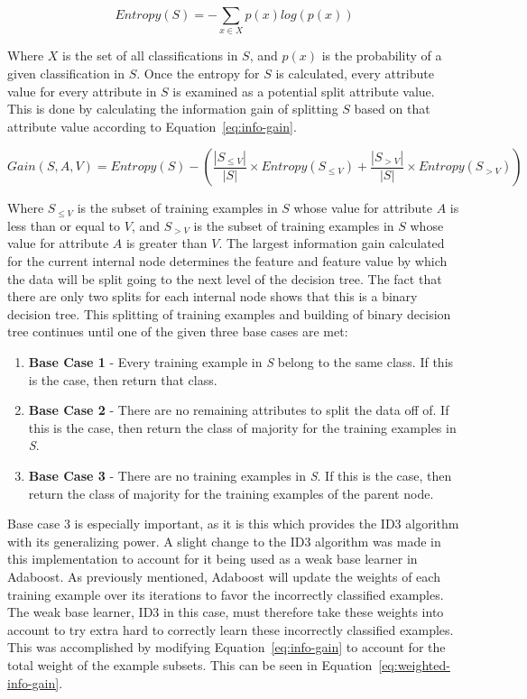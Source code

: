\documentclass[a4paper]{article}
\begin{document}
\begin{equation}
    \label{eq:entropy}
    Entropy(S) = -\sum_{x \in X} p(x)log(p(x))
\end{equation}

Where $X$ is the set of all classifications in $S$, and $p(x)$ is the probability of a given classification in $S$. Once the entropy for $S$ is calculated, every attribute value for every attribute in $S$ is examined as a potential split attribute value. This is done by calculating the information gain of splitting $S$ based on that attribute value according to Equation~\ref{eq:info-gain}.

\begin{equation}
    \label{eq:info-gain}
    Gain(S, A, V) = Entropy(S) - \left(\frac{|S_{\le V}|}{|S|}\times Entropy(S_{\le V}) + \frac{|S_{> V}|}{|S|}\times Entropy(S_{> V}) \right)
\end{equation}

Where $S_{\le V}$ is the subset of training examples in $S$ whose value for attribute $A$ is less than or equal to $V$, and $S_{> V}$ is the subset of training examples in $S$ whose value for attribute $A$ is greater than $V$. The largest information gain calculated for the current internal node determines the feature and feature value by which the data will be split going to the next level of the decision tree. The fact that there are only two splits for each internal node shows that this is a binary decision tree. This splitting of training examples and building of binary decision tree continues until one of the given three base cases are met:
\newpage
\begin{enumerate}
    \item \textbf{Base Case 1} - Every training example in \textit{S} belong to the same class. If this is the case, then return that class.

    \item \textbf{Base Case 2} - There are no remaining attributes to split the data off of. If this is the case, then return the class of majority for the training examples in \textit{S}.

    \item \textbf{Base Case 3} - There are no training examples in \textit{S}. If this is the case, then return the class of majority for the training examples of the parent node.
\end{enumerate}
Base case 3 is especially important, as it is this which provides the ID3 algorithm with its generalizing power. A slight change to the ID3 algorithm was made in this implementation to account for it being used as a weak base learner in Adaboost. As previously mentioned, Adaboost will update the weights of each training example over its iterations to favor the incorrectly classified examples. The weak base learner, ID3 in this case, must therefore take these weights into account to try extra hard to correctly learn these incorrectly classified examples. This was accomplished by modifying Equation~\ref{eq:info-gain} to account for the total weight of the example subsets. This can be seen in Equation~\ref{eq:weighted-info-gain}.
\end{document}
